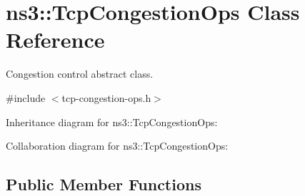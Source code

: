 \hypertarget{classns3_1_1TcpCongestionOps}{}\section{ns3\+:\+:Tcp\+Congestion\+Ops Class Reference}
\label{classns3_1_1TcpCongestionOps}


Congestion control abstract class.  




{\ttfamily \#include $<$tcp-\/congestion-\/ops.\+h$>$}



Inheritance diagram for ns3\+:\+:Tcp\+Congestion\+Ops\+:


Collaboration diagram for ns3\+:\+:Tcp\+Congestion\+Ops\+:
\subsection*{Public Member Functions}

